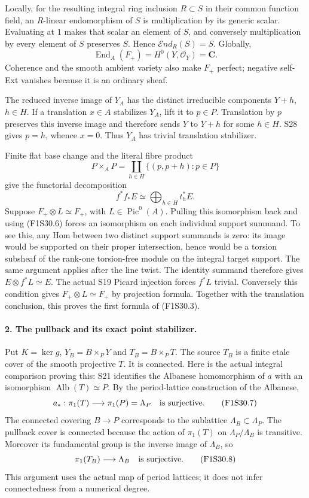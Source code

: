 Locally, for the resulting integral ring inclusion
$R\subset S$ in their common function field, an
$R$-linear endomorphism of $S$ is multiplication by
its generic scalar. Evaluating at $1$ makes that
scalar an element of $S$, and conversely multiplication
by every element of $S$ preserves $S$. Hence
$\mathcal End_R(S)=S$. Globally,
\[
                         \operatorname{End}_A(F_+)
                                  =H^0(Y,\mathcal O_Y)=\mathbf C.
 \tag{F1S30.5}
\]
Coherence and the smooth ambient variety also make
$F_+$ perfect; negative self-Ext vanishes because it
is an ordinary sheaf.

The reduced inverse image of $Y_A$ has the distinct
irreducible components $Y+h$, $h\in H$. If a translation
$x\in A$ stabilizes $Y_A$, lift it to $p\in P$.
Translation by $p$ preserves this inverse image and
therefore sends $Y$ to $Y+h$ for some $h\in H$.
S28 gives $p=h$, whence $x=0$. Thus $Y_A$ has
trivial translation stabilizer.

Finite flat base change and the literal fibre product
\[
 P\times_A P=\coprod_{h\in H}\{(p,p+h):p\in P\}
\]
give the functorial decomposition
\[
                       f^*f_*E\simeq\bigoplus_{h\in H}t_h^*E.
 \tag{F1S30.6}
\]
Suppose $F_+\otimes L\simeq F_+$, with
$L\in\operatorname{Pic}^0(A)$. Pulling this isomorphism
back and using (F1S30.6) forces an isomorphism on each
individual support summand. To see this, any Hom
between two distinct support summands is zero: its
image would be supported on their proper intersection,
hence would be a torsion subsheaf of the rank-one
torsion-free module on the integral target support.
The same argument applies after the line twist.
The identity summand therefore gives
$E\otimes f^*L\simeq E$. The actual S19 Picard injection
forces $f^*L$ trivial. Conversely this condition gives
$F_+\otimes L\simeq F_+$ by projection formula.
Together with the translation conclusion, this proves
the first formula of (F1S30.3).

\paragraph{2. The pullback and its exact point stabilizer.}
Put $K=\ker g$, $Y_B=B\times_PY$ and
$T_B=B\times_PT$. The source $T_B$ is a finite etale
cover of the smooth projective $T$. It is connected.
Here is the actual integral comparison proving this:
S21 identifies the Albanese homomorphism of $a$ with
an isomorphism $\operatorname{Alb}(T)\simeq P$.
By the period-lattice construction of the Albanese,
\[
                a_*:\pi_1(T)\longrightarrow\pi_1(P)=\Lambda_P
                               \quad\hbox{is surjective}.
 \tag{F1S30.7}
\]
The connected covering $B\to P$ corresponds to the
sublattice $\Lambda_B\subset\Lambda_P$. The pullback
cover is connected because the action of $\pi_1(T)$
on $\Lambda_P/\Lambda_B$ is transitive. Moreover its
fundamental group is the inverse image of
$\Lambda_B$, so
\[
                           \pi_1(T_B)\longrightarrow\Lambda_B
                                      \quad\hbox{is surjective}.
 \tag{F1S30.8}
\]
This argument uses the actual map of period lattices;
it does not infer connectedness from a numerical degree.

